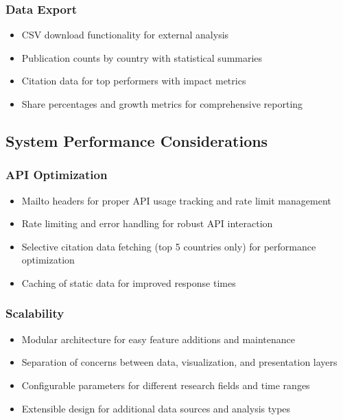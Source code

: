 \subsubsection{Data Export}

\begin{itemize}
\item CSV download functionality for external analysis
\item Publication counts by country with statistical summaries
\item Citation data for top performers with impact metrics
\item Share percentages and growth metrics for comprehensive reporting
\end{itemize}

\subsection{System Performance Considerations}

\subsubsection{API Optimization}

\begin{itemize}
\item Mailto headers for proper API usage tracking and rate limit management
\item Rate limiting and error handling for robust API interaction
\item Selective citation data fetching (top 5 countries only) for performance optimization
\item Caching of static data for improved response times
\end{itemize}

\subsubsection{Scalability}

\begin{itemize}
\item Modular architecture for easy feature additions and maintenance
\item Separation of concerns between data, visualization, and presentation layers
\item Configurable parameters for different research fields and time ranges
\item Extensible design for additional data sources and analysis types
\end{itemize}

